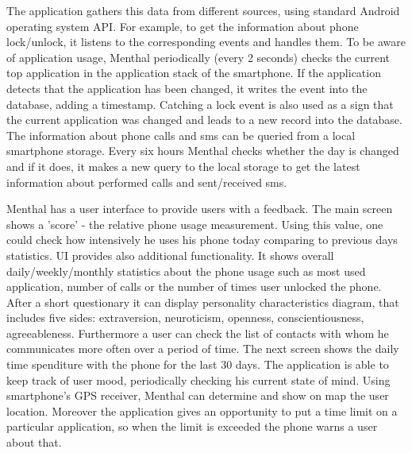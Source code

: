 The application gathers this data from different sources, using standard Android operating system API.
For example, to get the information about phone lock/unlock, it listens to the corresponding events and handles them.
To be aware of application usage, Menthal periodically (every 2 seconds) checks the current top application in the application stack of the smartphone.
If the application detects that the application has been changed, it writes the event into the database, adding a timestamp.
Catching a lock event is also used as a sign that the current application was changed and leads to a new record into the database.
The information about phone calls and sms can be queried from a local smartphone storage.
Every six hours Menthal checks whether the day is changed and if it does, it makes a new query to the local storage to get the latest information about performed calls and sent/received sms. 
 
Menthal has a user interface to provide users with a feedback. 
The main screen shows a 'score' - the relative phone usage measurement.
Using this value, one could check how intensively he uses his phone today comparing to previous days statistics.
UI provides also additional functionality.
It shows overall daily/weekly/monthly statistics about the phone usage such as most used application, number of calls or the number of times user unlocked the phone.
After a short questionary it can display personality characteristics diagram, that includes five sides: extraversion, neuroticism, openness, conscientiousness, agreeableness.
Furthermore a user can check the list of contacts with whom he communicates more often over a period of time.
The next screen shows the daily time spenditure with the phone for the last 30 days.
The application is able to keep track of user mood, periodically checking his current state of mind.
Using smartphone's GPS receiver, Menthal can determine and show on map the user location.
Moreover the application gives an opportunity to put a time limit on a particular application, so when the limit is exceeded the phone warns a user about that.

